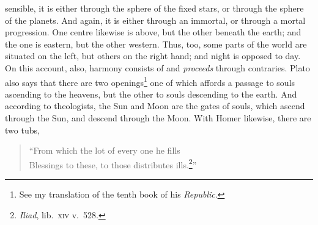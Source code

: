\documentclass[a4paper,12pt]{article}
\begin{document}
sensible, it is either through the sphere of the fixed stars, or through the
sphere of the planets. And again, it is either through an immortal, or through
a mortal progression. One centre likewise is above, but the other beneath the
earth; and the one is eastern, but the other western. Thus, too, some parts of
the world are situated on the left, but others on the right hand; and night is
opposed to day. On this account, also, harmony consists of and
\textit{proceeds} through contraries. Plato also says that there are two
openings\footnote{See my translation of the tenth book of his
\textit{Republic}.} one of which affords a passage to souls ascending to the
heavens, but the other to souls descending to the earth. And according to
theologists, the Sun and Moon are the gates of souls, which ascend through the
Sun, and descend through the Moon. With Homer likewise, there are two tubs,

\begin{verse}
``From which the lot of every one he fills\\
Blessings to these, to those distributes ills.\footnote{\textit{Iliad}, lib.~\textsc{xiv} v.~528.}''
\end{verse}
\end{document}
